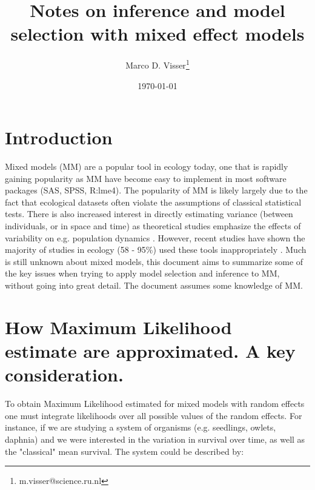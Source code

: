 \documentclass{article}\usepackage[]{graphicx}\usepackage[]{color}
\numberwithin{equation}{section} %
\numberwithin{figure}{section} %
\numberwithin{table}{section} %
\begin{document}

\title{Notes on inference and model selection with mixed effect models}
\date{\today}
\author[1,2]{Marco D. Visser\thanks{m.visser@science.ru.nl}}


\maketitle

\tableofcontents

\section{Introduction}

Mixed models (MM) are a popular tool in ecology today, one that is rapidly gaining popularity as MM have become easy to implement in most software packages (SAS, SPSS, R:lme4). The popularity of MM is likely largely due to the fact that ecological datasets often violate the assumptions of classical statistical tests. There is also increased interest in directly estimating variance (between individuals, or in space and time) as theoretical studies emphasize the effects of variability on e.g. population dynamics \citep{Pfister2003}. However, recent studies have shown the majority of studies in ecology (58 - 95\%) used these tools inappropriately \citep{Bolker2009}. Much is still unknown about mixed models, this document aims to summarize some of the key issues when trying to apply model selection and inference to MM, without going into great detail. The document assumes some knowledge of MM.

\section{How Maximum Likelihood estimate are approximated. A key consideration.}

To obtain Maximum Likelihood estimated for mixed models with random effects one must integrate likelihoods over all possible values of the random effects. For instance, if we are studying a system of organisms (e.g. seedlings, owlets, daphnia) and we were interested in the variation in survival over time, as well as the "classical" mean survival. The system could be described by: 
\end{document}
